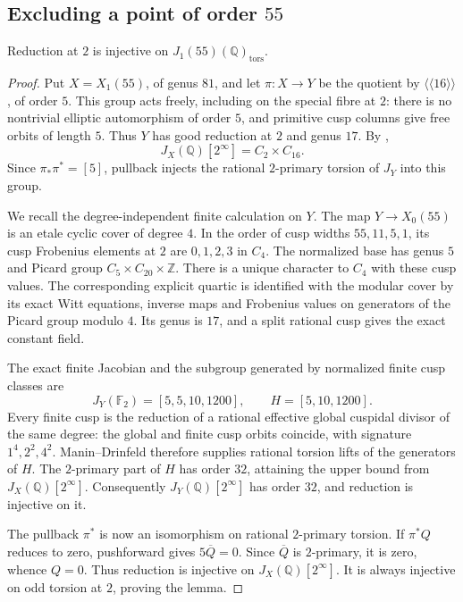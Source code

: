 \subsection{Excluding a point of order $55$}
\begin{lemma}\label{lem:decic55-source-injectivity}
Reduction at $2$ is injective on $J_1(55)(\mathbb Q)_{\mathrm{tors}}$.
\end{lemma}
\begin{proof}
Put $X=X_1(55)$, of genus $81$, and let $\pi:X\to Y$ be the quotient by
$\langle\langle16\rangle\rangle$, of order $5$.
This group acts freely, including on the special fibre at $2$:
there is no nontrivial elliptic automorphism of order $5$, and
primitive cusp columns give free orbits of length $5$.
Thus $Y$ has good reduction at $2$ and genus $17$.
By \cite[Theorem~4.13 and Table~2]{DEHMZ},
\[
 J_X(\mathbb Q)[2^\infty]=C_2\times C_{16}.
\]
Since $\pi_*\pi^*=[5]$, pullback injects the rational $2$-primary
torsion of $J_Y$ into this group.

We recall the degree-independent finite calculation on $Y$.
The map $Y\to X_0(55)$ is an etale cyclic cover of degree $4$.
In the order of cusp widths $55,11,5,1$, its cusp Frobenius
elements at $2$ are $0,1,2,3$ in $C_4$.
The normalized base has genus $5$ and Picard group
$C_5\times C_{20}\times\mathbb Z$.
There is a unique character to $C_4$ with these cusp values.
The corresponding explicit quartic is identified with the modular
cover by its exact Witt equations, inverse maps and Frobenius
values on generators of the Picard group modulo $4$.
Its genus is $17$, and a split rational cusp gives the exact
constant field.

The exact finite Jacobian and the subgroup generated by normalized
finite cusp classes are
\[
 J_Y(\mathbb F_2)=[5,5,10,1200],\qquad H=[5,10,1200].
\]
Every finite cusp is the reduction of a rational effective global
cuspidal divisor of the same degree: the global and finite cusp
orbits coincide, with signature $1^4,2^2,4^2$.
Manin--Drinfeld therefore supplies rational torsion lifts of the
generators of $H$.
The $2$-primary part of $H$ has order $32$, attaining the upper
bound from $J_X(\mathbb Q)[2^\infty]$.
Consequently $J_Y(\mathbb Q)[2^\infty]$ has order $32$, and
reduction is injective on it.

The pullback $\pi^*$ is now an isomorphism on rational
$2$-primary torsion.
If $\pi^*Q$ reduces to zero, pushforward gives
$5\overline Q=0$.
Since $\overline Q$ is $2$-primary, it is zero, whence $Q=0$.
Thus reduction is injective on $J_X(\mathbb Q)[2^\infty]$.
It is always injective on odd torsion at $2$, proving the lemma.
\end{proof}

